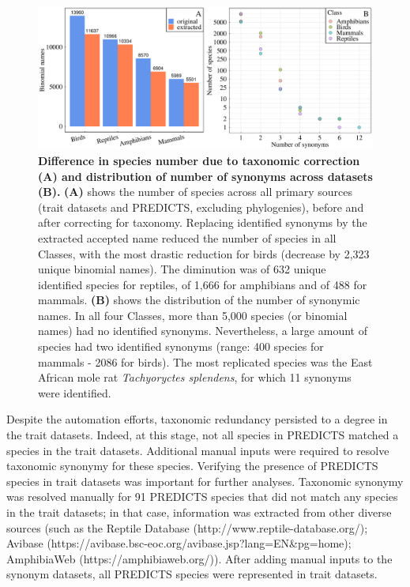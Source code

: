 \vspace{0.5cm}
\begin{figure}[h!]
\includegraphics[scale=0.45]{figures/chapter2/Taxonomic_corrections/tax_corrections}
\caption[Difference in species number due to taxonomic correction (A) and distribution of number of synonyms across datasets (B)]{\textbf{Difference in species number due to taxonomic correction (A) and distribution of number of synonyms across datasets (B).} \textbf{(A)} shows the number of species across all primary sources (trait datasets and PREDICTS, excluding phylogenies), before and after correcting for taxonomy. Replacing identified synonyms by the extracted accepted name reduced the number of species in all Classes, with the most drastic reduction for birds (decrease by 2,323 unique binomial names). The diminution was of 632 unique identified species for reptiles, of 1,666 for amphibians and of 488 for mammals. \textbf{(B)} shows the distribution of the number of synonymic names. In all four Classes, more than 5,000 species (or binomial names) had no identified synonyms. Nevertheless, a large amount of species had two identified synonyms (range: 400 species for mammals - 2086 for birds). The most replicated species was the East African mole rat \textit{Tachyoryctes splendens}, for which 11 synonyms were identified.}
\label{taxcor}
\end{figure}

Despite the automation efforts, taxonomic redundancy persisted to a degree in the trait datasets. Indeed, at this stage, not all species in PREDICTS matched a species in the trait datasets. Additional manual inputs were required to resolve taxonomic synonymy for these species. Verifying the presence of PREDICTS species in trait datasets was important for further analyses. Taxonomic synonymy was resolved manually for 91 PREDICTS species that did not match any species in the trait datasets; in that case, information was extracted from other diverse sources (such as the Reptile Database (http://www.reptile-database.org/); Avibase (https://avibase.bsc-eoc.org/avibase.jsp?lang=EN\&pg=home); AmphibiaWeb (https://amphibiaweb.org/)). After adding manual inputs to the synonym datasets, all PREDICTS species were represented in trait datasets. 

